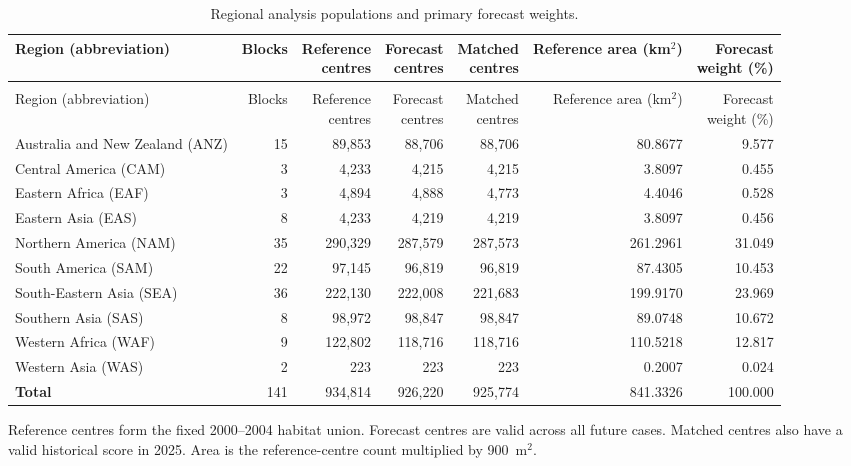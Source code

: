 \begingroup\small\setlength{\tabcolsep}{4pt}\renewcommand{\arraystretch}{1.14}
\begin{longtable}{>{\raggedright\arraybackslash}p{41mm}rrrrrr}
\caption{Regional analysis populations and primary forecast weights.}\label{tab:si_population}\\
\toprule
Region (abbreviation) & Blocks & \shortstack{Reference\\centres} & \shortstack{Forecast\\centres} & \shortstack{Matched\\centres} & \shortstack{Reference\\area (km$^2$)} & \shortstack{Forecast\\weight (\%)}\\
\midrule
\endfirsthead
\multicolumn{7}{l}{\small\textit{Supplementary Table \thetable\ continued}}\\
\toprule
Region (abbreviation) & Blocks & \shortstack{Reference\\centres} & \shortstack{Forecast\\centres} & \shortstack{Matched\\centres} & \shortstack{Reference\\area (km$^2$)} & \shortstack{Forecast\\weight (\%)}\\
\midrule
\endhead
\bottomrule
\endfoot
Australia and New Zealand (ANZ) & 15 & 89,853 & 88,706 & 88,706 & 80.8677 & 9.577\\
Central America (CAM) & 3 & 4,233 & 4,215 & 4,215 & 3.8097 & 0.455\\
Eastern Africa (EAF) & 3 & 4,894 & 4,888 & 4,773 & 4.4046 & 0.528\\
Eastern Asia (EAS) & 8 & 4,233 & 4,219 & 4,219 & 3.8097 & 0.456\\
Northern America (NAM) & 35 & 290,329 & 287,579 & 287,573 & 261.2961 & 31.049\\
South America (SAM) & 22 & 97,145 & 96,819 & 96,819 & 87.4305 & 10.453\\
South-Eastern Asia (SEA) & 36 & 222,130 & 222,008 & 221,683 & 199.9170 & 23.969\\
Southern Asia (SAS) & 8 & 98,972 & 98,847 & 98,847 & 89.0748 & 10.672\\
Western Africa (WAF) & 9 & 122,802 & 118,716 & 118,716 & 110.5218 & 12.817\\
Western Asia (WAS) & 2 & 223 & 223 & 223 & 0.2007 & 0.024\\
\textbf{Total} & 141 & 934,814 & 926,220 & 925,774 & 841.3326 & 100.000\\
\end{longtable}
{\small Reference centres form the fixed 2000--2004 habitat union. Forecast centres are valid across all future cases. Matched centres also have a valid historical score in 2025. Area is the reference-centre count multiplied by 900~m$^2$.\par}
\endgroup

